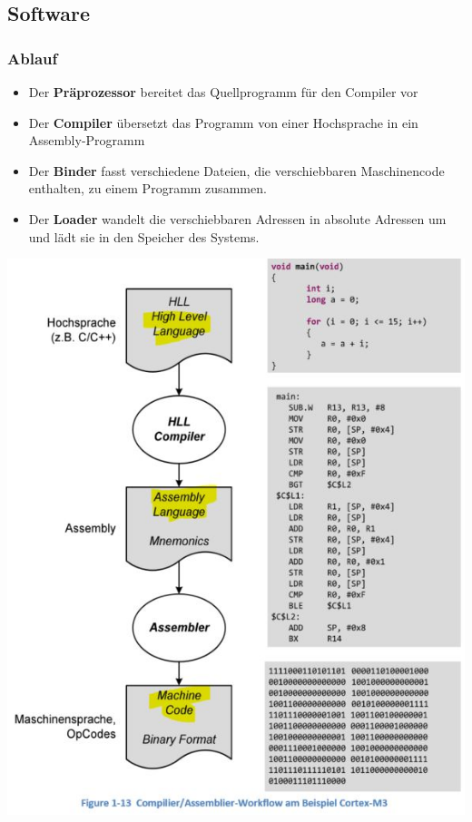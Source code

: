 \subsection{Software}
\begin{multicols}{2}
\subsubsection{Ablauf}
\begin{itemize}
    \item Der \textbf{Präprozessor} bereitet das Quellprogramm für den Compiler vor
    \item Der \textbf{Compiler} übersetzt das Programm von einer Hochsprache in ein Assembly-Programm
    \item Der \textbf{Binder} fasst verschiedene Dateien, die verschiebbaren Maschinencode enthalten, zu einem Programm zusammen.
    \item Der \textbf{Loader} wandelt die verschiebbaren Adressen in absolute Adressen um und lädt sie in den Speicher des Systems.
\end{itemize}

\includegraphics[width=\linewidth]{images/CompilerWorkflow}
\end{multicols}
\clearpage





















    